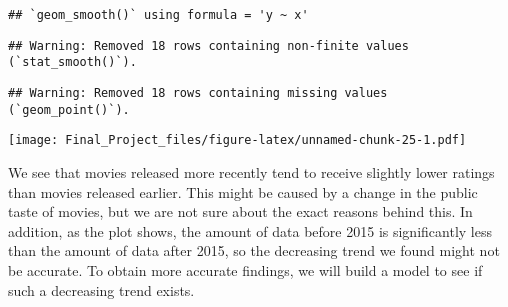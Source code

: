 \documentclass[
]{article}
\newenvironment{Shaded}{\begin{snugshade}}{\end{snugshade}}
\newcommand{\AttributeTok}[1]{\textcolor[rgb]{0.77,0.63,0.00}{#1}}
\newcommand{\CommentTok}[1]{\textcolor[rgb]{0.56,0.35,0.01}{\textit{#1}}}
\newcommand{\DecValTok}[1]{\textcolor[rgb]{0.00,0.00,0.81}{#1}}
\newcommand{\FunctionTok}[1]{\textcolor[rgb]{0.00,0.00,0.00}{#1}}
\newcommand{\NormalTok}[1]{#1}
\newcommand{\OtherTok}[1]{\textcolor[rgb]{0.56,0.35,0.01}{#1}}
\newcommand{\SpecialCharTok}[1]{\textcolor[rgb]{0.00,0.00,0.00}{#1}}
\newcommand{\StringTok}[1]{\textcolor[rgb]{0.31,0.60,0.02}{#1}}
\begin{document}
\begin{verbatim}
## `geom_smooth()` using formula = 'y ~ x'
\end{verbatim}

\begin{verbatim}
## Warning: Removed 18 rows containing non-finite values (`stat_smooth()`).
\end{verbatim}

\begin{verbatim}
## Warning: Removed 18 rows containing missing values (`geom_point()`).
\end{verbatim}

\texttt{[image: Final\_Project\_files/figure-latex/unnamed-chunk-25-1.pdf]}

We see that movies released more recently tend to receive slightly lower
ratings than movies released earlier. This might be caused by a change
in the public taste of movies, but we are not sure about the exact
reasons behind this. In addition, as the plot shows, the amount of data
before 2015 is significantly less than the amount of data after 2015, so
the decreasing trend we found might not be accurate. To obtain more
accurate findings, we will build a model to see if such a decreasing
trend exists.

\begin{Shaded}
\end{Shaded}
\end{document}
